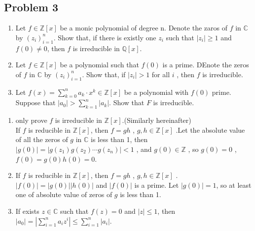 \documentclass[11pt]{ctexart}
\theoremstyle{definition}
\numberwithin{equation}{section}
\newcommand{\CC}{\mathbb{C}}
\newcommand{\QQ}{\mathbb{Q}}
\newcommand{\ZZ}{\mathbb{Z}}
\theoremstyle{definition}
\theoremstyle{remark}
\begin{document}
\subsection{Problem 3}
\begin{enumerate}
    \item Let $f \in \ZZ[x]$ be a monic polynomial of degree n. Denote the zaros of $f$ in $\CC$ by $(z_i)_{i=1}^n$. Show that, if there is existly one $z_i$ such that $|z_i| \geq 1$ and $f(0)\neq 0 $, then $f$ is irreducible in $\QQ[x]$.
    \item Let $f \in \ZZ[x]$ be a polynomial such that $f(0)$ is a prime. DEnote the zeros of $f$ in $\CC$ by $(z_i)_{i=1}^n$. Show that, if $|z_i| >1$ for all $i$ , then $f$ is irreducible.
    \item Let $f(x) = \sum_{k=0}^{n}a_k\cdot x^k\in \ZZ[x]$ be a polynomial with $f(0)$ prime. Suppose that $|a_0|>\sum_{k=1}^{n}|a_k|$. Show that $F$ is irreducible. 
\end{enumerate}
\begin{aaa}
\begin{enumerate}
    \item only prove $f$ is irreducible in $\ZZ[x]$.(Similarly hereinafter)\\
    If $f$ is reducible in $\ZZ[x]$, then $f=gh$ , $g,h \in \ZZ[x]$ .Let the absolute value of all the zeros of $g$ in $\CC$ is less than 1, then $|g(0)|=|g(z_1)g(z_2)\cdots g(z_n)|<1$ , and $g(0) \in \ZZ$ , so $g(0)=0$ ,$f(0)=g(0)h(0)=0$.
    \item If $f$ is reducible in $\ZZ[x]$, then $f=gh$ , $g,h \in \ZZ[x]$ .$|f(0)|=|g(0)||h(0)|$ and $|f(0)|$ is a prime. Let $|g(0)|=1$, so at least one of absolute value of zeros of $g$ is less than 1.
    \item If exists $z\in \CC$ such that $f(z)=0$ and $|z| \leq 1$, then $|a_0|=|\sum_{i=1}^{n}a_iz^i|\leq \sum_{i=1}^n |a_i|$.
\end{enumerate}
\end{aaa}
\end{document}
